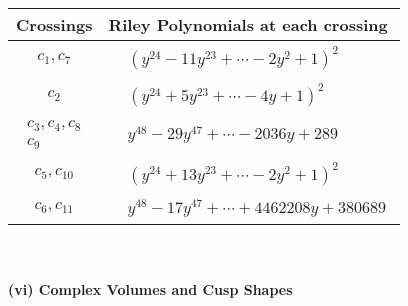 \documentclass[1p]{elsarticle_modified}
\theoremstyle{definition}
\begin{document}
\begin{tabular}{m{50pt}|m{274pt}}
Crossings & \hspace{64pt}Riley Polynomials at each crossing \\
\hline $$\begin{aligned}c_{1},c_{7}\end{aligned}$$&$\begin{aligned}
&(y^{24}-11 y^{23}+\cdots-2 y^2+1)^{2}
\end{aligned}$\\
\hline $$\begin{aligned}c_{2}\end{aligned}$$&$\begin{aligned}
&(y^{24}+5 y^{23}+\cdots-4 y+1)^{2}
\end{aligned}$\\
\hline $$\begin{aligned}c_{3},c_{4},c_{8}\\c_{9}\end{aligned}$$&$\begin{aligned}
&y^{48}-29 y^{47}+\cdots-2036 y+289
\end{aligned}$\\
\hline $$\begin{aligned}c_{5},c_{10}\end{aligned}$$&$\begin{aligned}
&(y^{24}+13 y^{23}+\cdots-2 y^2+1)^{2}
\end{aligned}$\\
\hline $$\begin{aligned}c_{6},c_{11}\end{aligned}$$&$\begin{aligned}
&y^{48}-17 y^{47}+\cdots+4462208 y+380689
\end{aligned}$\\
\hline
\end{tabular}\\~\\
\newpage\flushleft \textbf{(vi) Complex Volumes and Cusp Shapes}
\end{document}
